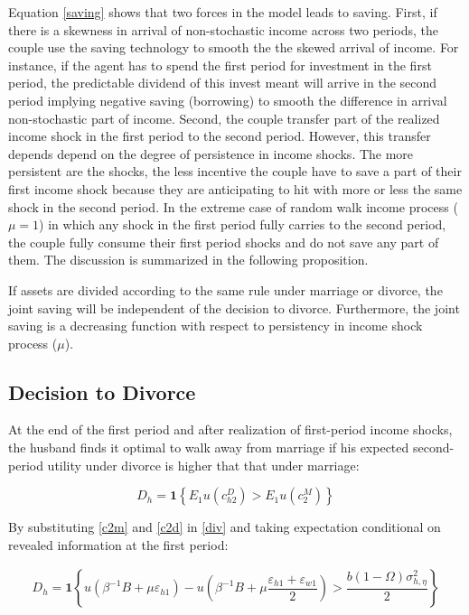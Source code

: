 Equation \eqref{saving} shows that two forces in the model leads to saving. First, if there is a skewness in arrival of non-stochastic income across two periods, the couple use the saving technology to smooth the the skewed arrival of income. For instance, if the agent has to spend the first period for investment in the first period, the predictable dividend of this invest meant will arrive in the second period implying negative saving (borrowing) to smooth the difference in arrival non-stochastic part of income. Second, the couple transfer part of the realized income shock in the first period to the second period. However, this transfer depends depend on the degree of persistence in income shocks. The more persistent are the shocks, the less incentive the couple have to save a part of their first income shock because they are anticipating to hit with more or less the same shock in the second period. In the extreme case of random walk income process ($\mu = 1$) in which any shock in the first period fully carries to the second period, the couple fully consume their first period shocks and do not save any part of them. The discussion is summarized in the following proposition.

\begin{prop}
If assets are divided according to the same rule under marriage or divorce, the joint saving will be independent of the decision to divorce. Furthermore, the joint saving is a decreasing function with respect to persistency in income shock process ($\mu$). 
\end{prop}
 

\subsection{Decision to Divorce}
At the end of the first period and after realization of first-period income shocks, the husband finds it optimal to walk away from marriage if his expected second-period utility under divorce is higher that that under marriage:

\begin{equation}
D_h = \mathbf 1 \left \{ E_1 u(c_{h2}^D) > E_1 u(c_2^M) \right \}
\label{div}
\end{equation}

By substituting \eqref{c2m} and \eqref{c2d}  in \eqref {div} and taking expectation conditional on revealed information at the first period:

\begin{align*}
D_h = \mathbf 1 \left \{u(\beta^{-1}B + \mu \varepsilon_{h1}) - u(\beta^{-1}B + \mu \dfrac{\varepsilon_{h1} + \varepsilon_{w1}}{2}) > \dfrac{b  (1- \Omega )\sigma^2_{h,\eta}}{2} \right \}
\end{align*}

